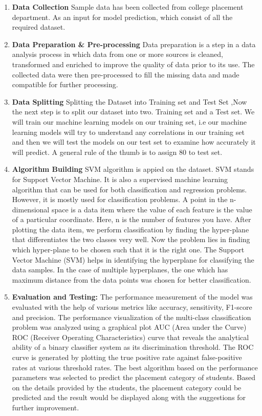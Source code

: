 \documentclass[12pt]{article}
\begin{document}
\begin{enumerate}
  \item  \textbf{Data Collection}
	     Sample data has been collected from college placement department. As an input for model prediction, which consist of all the required dataset.
  \item \textbf{Data Preparation \& Pre-processing}
	    Data preparation is a step in a data analysis process in which data from one or more sources is cleaned, transformed and enriched to improve the quality of data prior to its use. The collected data were then pre-processed to fill the missing data 
and made compatible for further processing.
  \item \textbf{Data Splitting}
Splitting the Dataset into Training set and Test Set ,Now the next step is to split our dataset into two. Training set and a 
Test set. We will train our machine learning models on our training set, i.e our machine learning models will try to 
understand any correlations in our training set and then we will test the models on our test set to examine how accurately 
it will predict. A general rule of the thumb is to assign 80%
to test set.
  \item \textbf{Algorithm Building}
SVM algorithm is appied on the dataset. SVM stands for Support Vector Machine. It is also a supervised machine learning 
algorithm that can be used for both classification and regression problems. However, it is mostly used for classification 
problems. A point in the n-dimensional space is a data item where the value of each feature is the value of a particular 
coordinate. Here, n is the number of features you have. After plotting the data item, we perform classification by finding 
the hyper-plane that differentiates the two classes very well. Now the problem lies in finding which hyper-plane to be 
chosen such that it is the right one. The Support Vector Machine (SVM) helps in identifying the hyperplane for 
classifying the data samples. In the case of multiple hyperplanes, the one which has maximum distance from the data 
points was chosen for better classification.
  \item \textbf{Evaluation and Testing:}
The performance measurement of the model was evaluated with the help of various metrics like accuracy, sensitivity, 
F1-score and precision. The performance visualization of the multi-class classification problem was analyzed using a 
graphical plot AUC (Area under the Curve) ROC (Receiver Operating Characteristics) curve that reveals the analytical 
ability of a binary classifier system as its discrimination threshold. The ROC curve is generated by plotting the true 
positive rate against false-positive rates at various threshold rates. The best algorithm based on the performance 
parameters was selected to predict the placement category of students. Based on the details provided by the students, the 
placement category could be predicted and the result would be displayed along with the suggestions for further 
improvement.
\end{enumerate}
\end{document}

